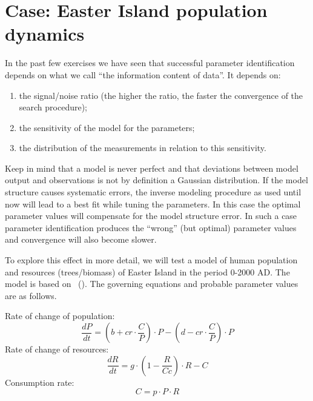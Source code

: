 


\section{Case: Easter Island population dynamics}


In the past few exercises we have seen that successful parameter identification depends on what we call ``the information content of data''. It depends on:
\begin{enumerate}
\item{the signal/noise ratio (the higher the ratio, the faster the convergence of the search procedure);}
\item{the sensitivity of the model for the parameters;}
\item{the distribution of the measurements in relation to this sensitivity.}
\end{enumerate}

Keep in mind that a model is never perfect and that deviations between model output and observations is not by definition a Gaussian distribution. If the model structure causes systematic errors, the inverse modeling procedure as used until now will lead to a best fit while tuning the parameters. In this case the optimal parameter values will compensate for the model structure error. In such a case parameter identification produces the ``wrong'' (but optimal) parameter values and convergence will also become slower.

To explore this effect in more detail, we will test a model of human population and resources (trees/biomass) of Easter Island in the period 0-2000 AD. The model is based on \citeauthor*{bran-tayl1998}~(\citeyear{bran-tayl1998}). The governing equations and probable parameter values are as follows.


Rate of change of population:
\begin{equation}
\frac{dP}{dt} = (b+cr\cdot{}\frac{C}{P})\cdot{}P-(d-cr\cdot{}\frac{C}{P})\cdot{P}
\end{equation}
Rate of change of resources:
\begin{equation}
\frac{dR}{dt} = g\cdot{}(1-\frac{R}{Cc})\cdot{}R-C
\end{equation}
Consumption rate:
\begin{equation}
C = p\cdot{}P\cdot{}R
\end{equation}

